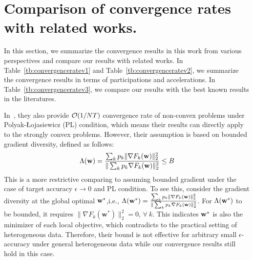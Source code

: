 

\section{Comparison of convergence rates with related works.}
\label{sec:app:comparison}
In this section, we summarize the convergence results in this work from various perspectives
and compare our results with related works. In Table~\ref{tb:convergenceratev1} and Table~\ref{tb:convergenceratev2}, we summarize 
the convergence results in terms of participations and accelerations. In Table~\ref{tb:convergenceratev3}, we compare our 
results with the best known results in the literatures. 

In~\cite{haddadpour2019convergence}, they also provide ${\mathcal{O}}(1/NT)$ convergence rate of non-convex problems under Polyak-Łojasiewicz (PL) condition, which
means their results can directly apply to the strongly convex problems. However, their assumption is based on bounded gradient diversity, defined as follows: 
\begin{align*}
	\Lambda({\mathbf{w}}) = \frac{\sum_{k}p_{k}\|\nabla F_{k}(\mathbf{w})\|_{2}^{2}}{\|\sum_{k}p_{k}\nabla F_{k}(\mathbf{w})\|_{2}^{2}} \leq B
\end{align*} 
This is a more restrictive comparing to assuming bounded gradient under the case of target accuracy $\epsilon \rightarrow 0$ and PL condition.
To see this, consider the gradient diversity at the global optimal ${\mathbf{w}}^*$,i.e., $\Lambda({\mathbf{w}}^*) = \frac{\sum_{k}p_{k}\|\nabla F_{k}(\mathbf{w})\|_{2}^{2}}{\|\sum_{k}p_{k}\nabla F_{k}(\mathbf{w})\|_{2}^{2}}$. For $\Lambda({\mathbf{w}}^*)$ to be bounded, it requires $\|\nabla F_{k}(\mathbf{w}^*)\|_{2}^{2} = 0$, $\forall \ k$. This indicates 
${\mathbf{w}}^*$ is also the minimizer of each local objective, which contradicts to the practical setting of heterogeneous data. Therefore, their bound 
is not effective for arbitrary small $\epsilon$-accuracy under general heterogeneous data while our convergence results still hold in this case.

